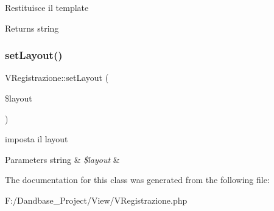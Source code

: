 Restituisce il template

\begin{DoxyReturn}{Returns}
string 
\end{DoxyReturn}
\mbox{\label{class_v_registrazione_afacb525933c2c700abd6758f18dd2516}} 
\subsubsection{\texorpdfstring{set\+Layout()}{setLayout()}}
{\footnotesize\ttfamily V\+Registrazione\+::set\+Layout (\begin{DoxyParamCaption}\item[{}]{\$layout }\end{DoxyParamCaption})}

imposta il layout


\begin{DoxyParams}[1]{Parameters}
string & {\em \$layout} & \\
\hline
\end{DoxyParams}


The documentation for this class was generated from the following file\+:\begin{DoxyCompactItemize}
\item 
F\+:/\+Dandbase\+\_\+\+Project/\+View/V\+Registrazione.\+php\end{DoxyCompactItemize}
